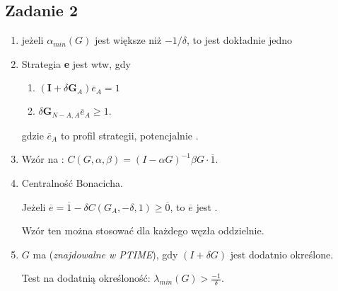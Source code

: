 \subsection{Zadanie 2}
\begin{enumerate}
  \item
    jeżeli $\alpha_{min}(G)$ jest większe niż $-1/\delta$, to jest dokładnie jedno
  \item Strategia \textbf{e} jest  wtw, gdy
    \begin{enumerate}
      \item $ (\textbf{I} + \delta \textbf{G}_{A})\overline{e}_{A} = 1$
      \item $ \delta\textbf{G}_{N-A,A}\overline{e}_A \geq 1.$
    \end{enumerate}

    gdzie $\overline{e}_A$ to profil strategii, potencjalnie .

  \item
    Wzór na :
    $C(G, \alpha, \beta) = (I - \alpha G)^{-1} \beta G \cdot \overline{1}$.

  \item
    Centralność Bonacicha.

    Jeżeli $\overline{e} = \overline{1} - \delta C(G_A, -\delta, 1) \geq \overline{0}$,
    to $\overline{e}$  jest .

    Wzór ten można stosować dla każdego węzła oddzielnie.

  \item
    $G$ ma  (\textit{znajdowalne w PTIME}), gdy
    $(I+\delta G)$ jest dodatnio określone.

    Test na dodatnią określoność: $\lambda_{min}(G) > \frac{-1}{\delta}$.
\end{enumerate}

